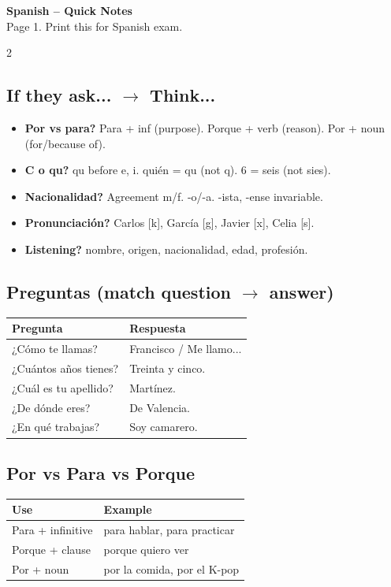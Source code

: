 \documentclass[10pt,landscape,a4paper]{article}
\begin{document}
\begin{center}
{\LARGE\bfseries\color{accent} Spanish -- Quick Notes}\\[0.3em]
\small Page 1. Print this for Spanish exam.
\end{center}
\vspace{0.5em}
\begin{multicols}{2}
\subsection*{\color{accent} If they ask... $\to$ Think...}
\begin{itemize}[leftmargin=*,nosep]
\item \textbf{Por vs para?} Para + inf (purpose). Porque + verb (reason). Por + noun (for/because of).
\item \textbf{C o qu?} qu before e, i. qui\'en = qu (not q). 6 = seis (not sies).
\item \textbf{Nacionalidad?} Agreement m/f. -o/-a. -ista, -ense invariable.
\item \textbf{Pronunciaci\'on?} Carlos [k], Garc\'ia [g], Javier [x], Celia [s].
\item \textbf{Listening?} nombre, origen, nacionalidad, edad, profesi\'on.
\end{itemize}

\subsection*{\color{accent} Preguntas (match question $\to$ answer)}
\begin{center}
\small
\begin{tabular}{@{}ll@{}}
\toprule
\textbf{Pregunta} & \textbf{Respuesta} \\
\midrule
¿C\'omo te llamas? & Francisco / Me llamo... \\
¿Cu\'antos a\~nos tienes? & Treinta y cinco. \\
¿Cu\'al es tu apellido? & Mart\'inez. \\
¿De d\'onde eres? & De Valencia. \\
¿En qu\'e trabajas? & Soy camarero. \\
\bottomrule
\end{tabular}
\end{center}

\subsection*{\color{accent} Por vs Para vs Porque}
\begin{center}
\small
\begin{tabular}{@{}ll@{}}
\toprule
\textbf{Use} & \textbf{Example} \\
\midrule
Para + infinitive & para hablar, para practicar \\
Porque + clause & porque quiero ver \\
Por + noun & por la comida, por el K-pop \\
\bottomrule
\end{tabular}
\end{center}


\end{multicols}
\end{document}
